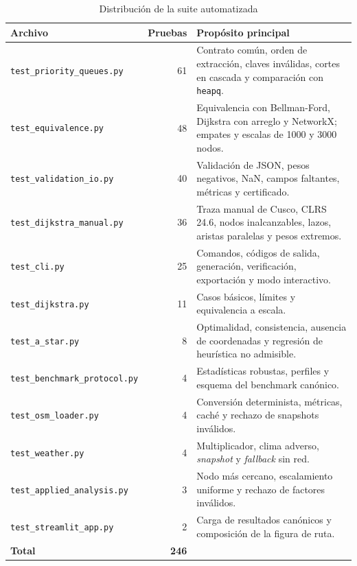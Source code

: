\begin{table}[H]
    \centering
    \fontsize{9}{11}\selectfont
    \renewcommand{\arraystretch}{1.12}
    \caption{Distribución de la suite automatizada}
    \label{tab:suite_pruebas}
    \begin{tabularx}{\textwidth}{@{}>{\raggedright\arraybackslash}p{5.3cm} r >{\raggedright\arraybackslash}X@{}}
        \toprule
        \textbf{Archivo} & \textbf{Pruebas} & \textbf{Propósito principal} \\
        \midrule
        \texttt{test\_priority\_queues.py} & 61 & Contrato común, orden de extracción, claves inválidas, cortes en cascada y comparación con \texttt{heapq}. \\
        \texttt{test\_equivalence.py} & 48 & Equivalencia con Bellman-Ford, Dijkstra con arreglo y NetworkX; empates y escalas de 1000 y 3000 nodos. \\
        \texttt{test\_validation\_io.py} & 40 & Validación de JSON, pesos negativos, NaN, campos faltantes, métricas y certificado. \\
        \texttt{test\_dijkstra\_manual.py} & 36 & Traza manual de Cusco, CLRS 24.6, nodos inalcanzables, lazos, aristas paralelas y pesos extremos. \\
        \texttt{test\_cli.py} & 25 & Comandos, códigos de salida, generación, verificación, exportación y modo interactivo. \\
        \texttt{test\_dijkstra.py} & 11 & Casos básicos, límites y equivalencia a escala. \\
        \texttt{test\_a\_star.py} & 8 & Optimalidad, consistencia, ausencia de coordenadas y regresión de heurística no admisible. \\
        \texttt{test\_benchmark\_protocol.py} & 4 & Estadísticas robustas, perfiles y esquema del benchmark canónico. \\
        \texttt{test\_osm\_loader.py} & 4 & Conversión determinista, métricas, caché y rechazo de snapshots inválidos. \\
        \texttt{test\_weather.py} & 4 & Multiplicador, clima adverso, \textit{snapshot} y \textit{fallback} sin red. \\
        \texttt{test\_applied\_analysis.py} & 3 & Nodo más cercano, escalamiento uniforme y rechazo de factores inválidos. \\
        \texttt{test\_streamlit\_app.py} & 2 & Carga de resultados canónicos y composición de la figura de ruta. \\
        \midrule
        \textbf{Total} & \textbf{246} & \\
        \bottomrule
    \end{tabularx}
\end{table}

